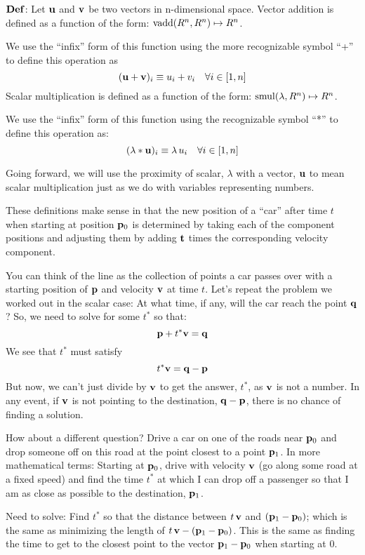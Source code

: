 \documentclass[12pt]{article}
\begin{document}
${\bf Def}$: Let ${\bf u}$ and ${\bf v}$ be two vectors in n-dimensional space. 
Vector addition is defined as a function of the form: 
${\rm vadd}(R^n, R^n) \mapsto R^n$. 

We use the ``infix'' form of this function using the more 
recognizable symbol ``+'' to define this operation as
$$ ({\bf u} + {\bf v})_i \equiv u_i + v_i \quad \forall i \in [1,n]$$
Scalar multiplication is defined as a function of the form: 
${\rm smul}(\lambda, R^n) \mapsto R^n$. 

We use the ``infix'' form of this function using
the recognizable symbol ``*'' to define this operation as:
$$ (\lambda * {\bf u})_i \equiv \lambda \, u_i \quad \forall i \in [1,n]$$

Going forward, we will use the proximity of scalar, 
$\lambda$ with a vector, ${\bf u}$ to mean scalar multiplication just as we 
do with variables representing numbers.

These definitions make sense in that the new position of a ``car'' after time 
$t$ when starting at position ${\bf p}_0$ is determined by taking each of the 
component positions and adjusting them by adding ${\bf t}$ times the 
corresponding velocity component.

You can think of the line as the collection of points a car passes over 
with a starting position of ${\bf p}$ and velocity ${\bf v}$ at time $t$.
Let's repeat the problem we worked out in the scalar case:
At what time, if any, will the car reach the point ${\bf q}$?
So, we need to solve for some $t^*$ so that: 
$${\bf p} + t^* {\bf v} = {\bf q}$$
We see that $t^*$ must satisfy
$$ t^*{\bf v} = {\bf q} - {\bf p}$$
But now, we can't just divide by ${\bf v}$ to get the answer, $t^*$, 
as ${\bf v}$ is not a number.
In any event, if ${\bf v}$ is not pointing to the destination, 
${\bf q} - {\bf p}$, there is no chance of finding a solution.

How about a different question? Drive a car on one of the roads near 
${\bf p}_0$ and drop someone off on this road at the point closest to a 
point ${\bf p}_1$. 
In more mathematical terms: Starting at ${\bf p}_0$, drive with velocity 
${\bf v}$ (go along some road at a fixed speed) and find the time $t^*$ at 
which I can drop off a passenger so that I am as close as possible to the 
destination, ${\bf p}_1$. 

Need to solve: Find $t^*$ so that the distance between $t \, {\bf v}$ and 
$({\bf p}_1 - {\bf p}_0)$; which is the same as minimizing the length of 
$t \, {\bf v} - ({\bf p}_1 - {\bf p}_0)$. 
This is the same as finding the time to get to the closest point to the 
vector ${\bf p}_1 - {\bf p}_0$ when starting at $0$.
\end{document}
